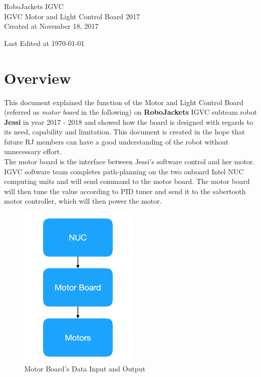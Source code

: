 \documentclass[letterpaper, 12pt]{article}
\begin{document}
\begin{titlepage}
\centering
	{\LARGE RoboJackets IGVC}\\
	\vspace{1cm}
	{\Large IGVC Motor and Light Control Board 2017}\\
	\vfill
	{\large Created at November 18, 2017}\\
	\vspace{1cm}
	{\large Last Edited at \today\par}
\end{titlepage}

\tableofcontents

\pagebreak

\section{Overview}
This document explained the function of the Motor and Light Control Board (referred as \emph{motor board} in the following) on \textbf{RoboJackets} IGVC subteam robot \textbf{Jessi} in year 2017 - 2018 and showed how the board is designed with regards to its need, capability and limitation. This document is created in the hope that future RJ members can have a good understanding of the robot without unnecessary effort. \vspace{6pt}\\
The motor board is the interface between Jessi's software control and her motor. IGVC software team completes path-planning on the two onboard Intel NUC computing units and will send command to the motor board. The motor board will then tune the value according to PID tuner and send it to the sabertooth motor controller, which will then power the motor.\\
\begin{figure}[h]
\centering
\includegraphics[width=0.5\textwidth]{UpandLow.png}
\caption{Motor Board's Data Input and Output}
\end{figure}
\end{document}
